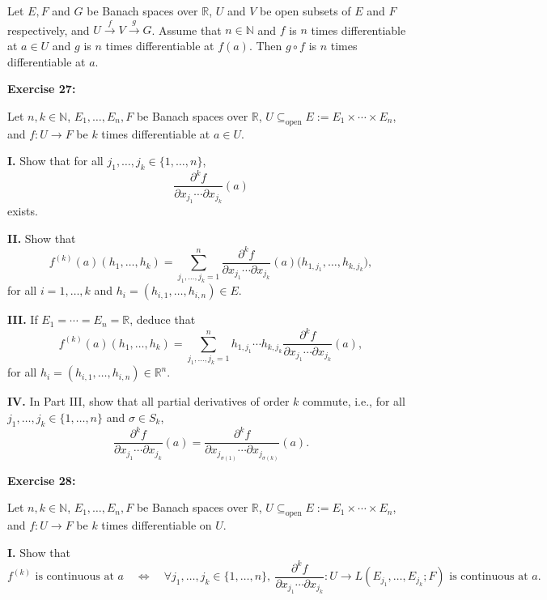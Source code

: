 \documentclass{book}
\begin{document}
Let $E, F$ and $G$ be Banach spaces over $\mathbb{R}$, $U$ and $V$ be open subsets of $E$ and $F$ respectively, and $U \xrightarrow{f} V \xrightarrow{g} G$. Assume that $n \in \mathbb{N}$ and $f$ is $n$ times differentiable at $a \in U$ and $g$ is $n$ times differentiable at $f(a)$. Then $g \circ f$ is $n$ times differentiable at $a$.


\textbf{Exercise 27:}

Let $n,k \in \mathbb{N}$, $E_1,\dots,E_n,F$ be Banach spaces over $\mathbb{R}$,
$U \subseteq_{\mathrm{open}} E := E_1 \times \cdots \times E_n$, and
$f : U \to F$ be $k$ times differentiable at $a \in U$.

\medskip

\textbf{I.} Show that for all $j_1,\dots,j_k \in \{1,\dots,n\}$,
\[
\frac{\partial^k f}{\partial x_{j_1}\cdots\partial x_{j_k}}(a)
\]
exists.

\medskip

\textbf{II.} Show that
\[
f^{(k)}(a)(h_1,\dots,h_k)
=
\sum_{j_1,\dots,j_k=1}^{n}
\frac{\partial^k f}{\partial x_{j_1}\cdots\partial x_{j_k}}(a)
\big(h_{1,j_1},\dots,h_{k,j_k}\big),
\]
for all $i=1,\dots,k$ and $h_i=(h_{i,1},\dots,h_{i,n}) \in E$.


\medskip

\textbf{III.} If $E_1=\cdots=E_n=\mathbb{R}$, deduce that
\[
f^{(k)}(a)(h_1,\dots,h_k)
=
\sum_{j_1,\dots,j_k=1}^{n}
h_{1,j_1}\cdots h_{k,j_k}
\frac{\partial^k f}{\partial x_{j_1}\cdots\partial x_{j_k}}(a),
\]
for all $h_i=(h_{i,1},\dots,h_{i,n}) \in \mathbb{R}^n$.

\medskip

\textbf{IV.} In Part III, show that all partial derivatives of order $k$ commute, i.e.,
for all $j_1,\dots,j_k \in \{1,\dots,n\}$ and $\sigma \in S_k$,
\[
\frac{\partial^k f}{\partial x_{j_1}\cdots\partial x_{j_k}}(a)
=
\frac{\partial^k f}{\partial x_{j_{\sigma(1)}}\cdots\partial x_{j_{\sigma(k)}}}(a).
\]

\bigskip

\textbf{Exercise 28:}

Let $n,k \in \mathbb{N}$, $E_1,\dots,E_n,F$ be Banach spaces over $\mathbb{R}$,
$U \subseteq_{\mathrm{open}} E := E_1 \times \cdots \times E_n$, and
$f : U \to F$ be $k$ times differentiable on $U$.

\medskip

\textbf{I.} Show that
\[
f^{(k)} \text{ is continuous at } a
\quad\Longleftrightarrow\quad
\forall j_1,\dots,j_k \in \{1,\dots,n\},\ 
\frac{\partial^k f}{\partial x_{j_1}\cdots\partial x_{j_k}}
: U \to L(E_{j_1},\dots,E_{j_k};F)
\text{ is continuous at } a.\]
\end{document}
